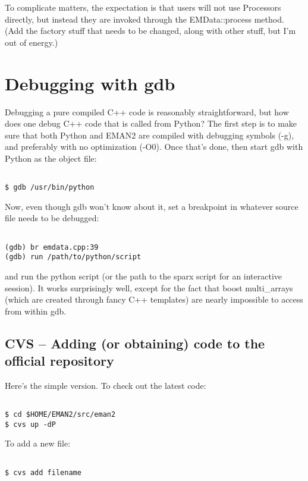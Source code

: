  To complicate matters, the expectation is that users will not use Processors directly, but instead they are invoked through the EMData::process method. (Add the factory stuff that needs to be changed, along with other stuff, but I'm out of energy.)
\section*{Debugging with gdb}


 Debugging a pure compiled C++ code is reasonably straightforward, but how does one debug C++ code that is called from Python? The first step is to make sure that both Python and EMAN2 are compiled with debugging symbols (-g), and preferably with no optimization (-O0). Once that's done, then start gdb with Python as the object file:
\begin{verbatim}

$ gdb /usr/bin/python

\end{verbatim}


 Now, even though gdb won't know about it, set a breakpoint in whatever source file needs to be debugged:
\begin{verbatim}

(gdb) br emdata.cpp:39
(gdb) run /path/to/python/script

\end{verbatim}


 and run the python script (or the path to the sparx script for an interactive session). It works surprisingly well, except for the fact that boost multi\_arrays (which are created through fancy C++ templates) are nearly impossible to access from within gdb.
\subsection{CVS -- Adding (or obtaining) code to the official repository}


 Here's the simple version. To check out the latest code:
\begin{verbatim}

$ cd $HOME/EMAN2/src/eman2
$ cvs up -dP

\end{verbatim}


 To add a new file:
\begin{verbatim}

$ cvs add filename

\end{verbatim}


